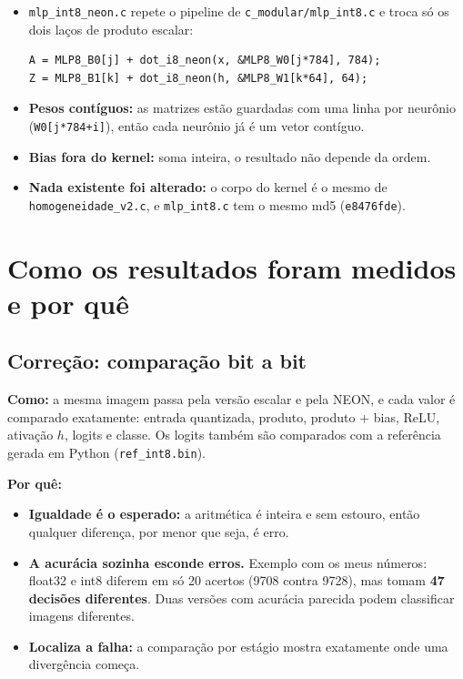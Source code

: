 \documentclass[10pt]{article}
\begin{document}
\begin{itemize}
\item \texttt{mlp\_int8\_neon.c} repete o pipeline de \nolinkurl{c_modular/mlp_int8.c} e troca só os
      dois laços de produto escalar:
\begin{lstlisting}
A = MLP8_B0[j] + dot_i8_neon(x, &MLP8_W0[j*784], 784);
Z = MLP8_B1[k] + dot_i8_neon(h, &MLP8_W1[k*64], 64);
\end{lstlisting}
\item \textbf{Pesos contíguos:} as matrizes estão guardadas com uma linha por neurônio
      (\texttt{W0[j*784+i]}), então cada neurônio já é um vetor contíguo.
\item \textbf{Bias fora do kernel:} soma inteira, o resultado não depende da ordem.
\item \textbf{Nada existente foi alterado:} o corpo do kernel é o mesmo de
      \nolinkurl{homogeneidade_v2.c}, e \texttt{mlp\_int8.c} tem o mesmo md5 (\texttt{e8476fde}).
\end{itemize}

\section{Como os resultados foram medidos e por quê}

\subsection{Correção: comparação bit a bit}
\textbf{Como:} a mesma imagem passa pela versão escalar e pela NEON, e cada valor é comparado
exatamente: entrada quantizada, produto, produto + bias, ReLU, ativação $h$, logits e classe. Os
logits também são comparados com a referência gerada em Python (\texttt{ref\_int8.bin}).

\textbf{Por quê:}
\begin{itemize}
\item \textbf{Igualdade é o esperado:} a aritmética é inteira e sem estouro, então qualquer diferença,
      por menor que seja, é erro.
\item \textbf{A acurácia sozinha esconde erros.} Exemplo com os meus números: float32 e int8 diferem
      em só 20 acertos (9708 contra 9728), mas tomam \textbf{47 decisões diferentes}. Duas versões com
      acurácia parecida podem classificar imagens diferentes.
\item \textbf{Localiza a falha:} a comparação por estágio mostra exatamente onde uma divergência começa.
\end{itemize}
\end{document}
